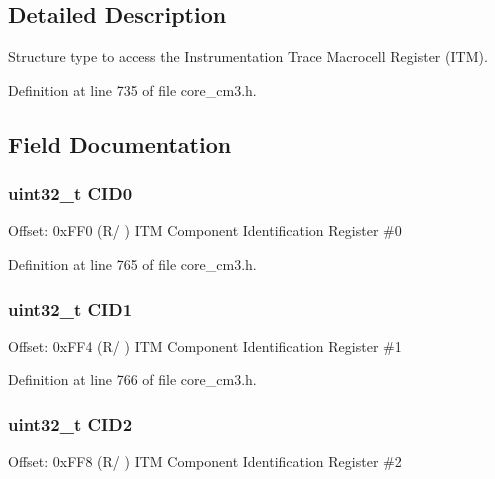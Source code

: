 \subsection{Detailed Description}
Structure type to access the Instrumentation Trace Macrocell Register (I\+TM). 

Definition at line 735 of file core\+\_\+cm3.\+h.



\subsection{Field Documentation}
\subsubsection[{\texorpdfstring{C\+I\+D0}{CID0}}]{ uint32\+\_\+t C\+I\+D0}\hypertarget{struct_i_t_m___type_a26bbad5d9e0f1d302611d52373aef839}{}\label{struct_i_t_m___type_a26bbad5d9e0f1d302611d52373aef839}
Offset\+: 0x\+F\+F0 (R/ ) I\+TM Component Identification Register \#0 

Definition at line 765 of file core\+\_\+cm3.\+h.

\subsubsection[{\texorpdfstring{C\+I\+D1}{CID1}}]{ uint32\+\_\+t C\+I\+D1}\hypertarget{struct_i_t_m___type_a4e60a608afd6433ecd943d95e417b80b}{}\label{struct_i_t_m___type_a4e60a608afd6433ecd943d95e417b80b}
Offset\+: 0x\+F\+F4 (R/ ) I\+TM Component Identification Register \#1 

Definition at line 766 of file core\+\_\+cm3.\+h.

\subsubsection[{\texorpdfstring{C\+I\+D2}{CID2}}]{ uint32\+\_\+t C\+I\+D2}\hypertarget{struct_i_t_m___type_ad98950702e55d1851e91b22de07b11aa}{}\label{struct_i_t_m___type_ad98950702e55d1851e91b22de07b11aa}
Offset\+: 0x\+F\+F8 (R/ ) I\+TM Component Identification Register \#2 

